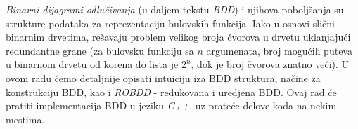 \emph{Binarni dijagrami odlu\v{c}ivanja} (u daljem tekstu \emph{BDD}) i njihova pobolj\v{s}anja su strukture podataka za reprezentaciju bulovskih funkcija. Iako u osnovi sli\v{c}ni binarnim drvetima, re\v{s}avaju problem velikog broja \v{c}vorova u drvetu uklanjaju\'c{}i redundantne grane (za bulovsku funkciju sa $n$ argumenata, broj mogu\'c{}ih puteva u binarnom drvetu od korena do lista je $2^{n}$, dok je broj \v{c}vorova znatno ve\'c{}i). U ovom radu \'c{}emo detaljnije opisati intuiciju iza BDD struktura, na\v{c}ine za konstrukciju BDD, kao i \emph{ROBDD} - redukovana i uredjena BDD. Ovaj rad \'c{}e pratiti implementacija BDD u jeziku \emph{C++}, uz prate\'c{}e delove koda na nekim mestima.

\cite{BDD}
